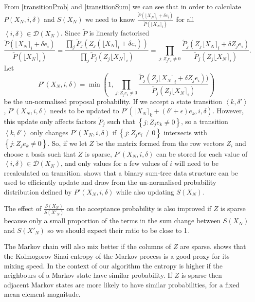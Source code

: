 \documentclass{article}
\begin{document}
From \eqref{transitionProb} and \eqref{transitionSum} we can see that in order to calculate $P(X_N,i,\delta)$ and $S(X_N)$ we need to know $\frac{\tilde{P}(\lfloor X_N \rceil_i + \delta e_i)}{\tilde{P}(\lfloor X_N \rceil_i)}$ for all $\left<i,\delta\right> \in \mathcal{D}(X_N)$.  Since $\tilde{P}$ is linearly factorised
\[
\frac{\tilde{P}(\lfloor X_N \rceil_i + \delta e_i)}{\tilde{P}(\lfloor X_N \rceil_i)} =
\frac{\prod_j \tilde{P}_j(Z_j(\lfloor X_N \rceil_i + \delta e_i))}{\prod_j \tilde{P}_j(Z_j\lfloor X_N \rceil_i)} =
\prod_{j : Z_j e_i \ne 0} \frac{\tilde{P}_j(Z_j \lfloor X_N \rceil_i + \delta Z_j e_i)}{\tilde{P}_j(Z_j \lfloor X_N \rceil_i)}.
\]
Let
\[
P'(X_N,i,\delta) = \min\left(1, 
\prod_{j : Z_je_i \ne 0} \frac{\tilde{P}_j(Z_j \lfloor X_N \rceil_i + \delta Z_j e_i))}{\tilde{P}_j(Z_j \lfloor X_N \rceil_i)}\right)
\]
be the un-normalised proposal probability. If we accept a state transition $\left<k,\delta'\right>$, $P'(X_N,i,\delta)$ needs to be updated 
to $P'(\lfloor X_N \rceil_k + (\delta'+\epsilon)e_k, i, \delta)$. However, this update only affects factors $\tilde{P}_j$ such that  $\left\{j : Z_j e_k \ne 0 \right\}$, so a transition $\left<k,\delta'\right>$ only changes $P'(X_N,i,\delta)$ if $\left\{j : Z_je_i \ne 0\right\}$ intersects with $\left\{j : Z_je_k \ne 0\right\}$. So, if we let $Z$ be the matrix formed from the row vectors $Z_i$ and choose a basis such that $Z$ is sparse, $P'(X_N,i,\delta)$ can be stored for each value of $\left<i,\delta\right> \in \mathcal{D}(X_N)$, and only values for a few values of $i$ will need to be recalculated on transition. \citet{TangMutableCategorical} shows that a binary sum-tree data structure can be used to efficiently update and draw from the un-normalised probability distribution defined by $P'(X_N,i,\delta)$ while also updating $S(X_N)$.
 
The effect of $\frac{S(X_N)}{S(X'_N)}$ on the acceptance probability is also improved if $Z$ is sparse because only a small proportion of the terms in the sum change between $S(X_N)$ and $S(X'_N)$ so we should expect their ratio to be close to 1.

The Markov chain will also mix better if the columns of $Z$ are sparse. \citet{mihelich2018maximum} shows that the Kolmogorov-Sinai entropy of the Markov process is a good proxy for its mixing speed. In the context of our algorithm the entropy is higher if the neighbours of a Markov state have similar probability. If $Z$ is sparse then adjacent Markov states are more likely to have similar probabilities, for a fixed mean element magnitude.
\end{document}
